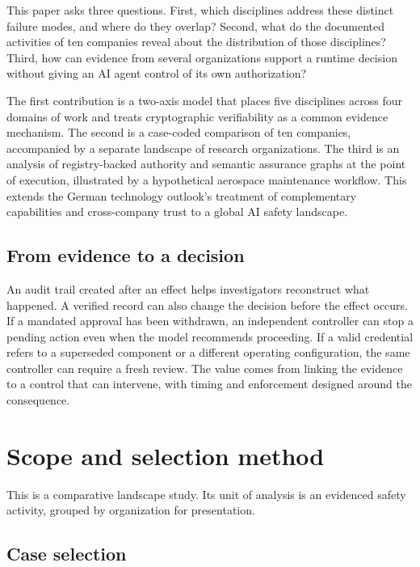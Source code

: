 This paper asks three questions. First, which disciplines address these distinct failure modes, and where do they overlap? Second, what do the documented activities of ten companies reveal about the distribution of those disciplines? Third, how can evidence from several organizations support a runtime decision without giving an AI agent control of its own authorization?

The first contribution is a two-axis model that places five disciplines across four domains of work and treats cryptographic verifiability as a common evidence mechanism. The second is a case-coded comparison of ten companies, accompanied by a separate landscape of research organizations. The third is an analysis of registry-backed authority and semantic assurance graphs at the point of execution, illustrated by a hypothetical aerospace maintenance workflow. This extends the German technology outlook's treatment of complementary capabilities and cross-company trust to a global AI safety landscape.~\cite{src4,src5,src6}

\subsection{From evidence to a decision}

An audit trail created after an effect helps investigators reconstruct what happened. A verified record can also change the decision before the effect occurs. If a mandated approval has been withdrawn, an independent controller can stop a pending action even when the model recommends proceeding. If a valid credential refers to a superseded component or a different operating configuration, the same controller can require a fresh review. The value comes from linking the evidence to a control that can intervene, with timing and enforcement designed around the consequence.~\cite{src2,src5,src7,src8}

\section{Scope and selection method}
\label{sec:scope-and-method}

This is a comparative landscape study. Its unit of analysis is an evidenced safety activity, grouped by organization for presentation.

\subsection{Case selection}


